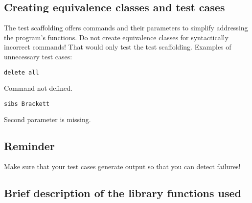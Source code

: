 \subsection*{Creating equivalence classes and test cases}

The test scaffolding offers commands and their parameters
to simplify addressing the program's functions.
Do not create equivalence classes for syntactically incorrect
commands!  That would only test the test scaffolding.
Examples of unnecessary test cases:
\begin{verbatim}
delete all
\end{verbatim}
Command not defined.
\begin{verbatim}
sibs Brackett
\end{verbatim}
Second parameter is missing.

\subsection*{Reminder}

Make sure that your test cases generate output so that you can
detect failures!

\newpage
{}

\subsection*{Brief description of the library functions used}


